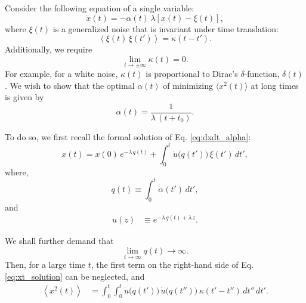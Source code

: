 \documentclass[reprint]{revtex4-1}
\begin{document}
Consider the following equation
of a single variable:
%
\begin{equation}
\dot x(t) = -\alpha(t) \, \lambda \left[ x(t) - \xi(t) \right],
\label{eq:dxdt_alpha}
\end{equation}
%
where $\xi(t)$ is a generalized noise
that is invariant under time translation:
%
\begin{equation}
\left\langle \xi(t) \, \xi(t') \right\rangle
=
\kappa(t - t').
\label{eq:noise_correlation}
\end{equation}
%
Additionally, we require
\begin{equation}
  \lim_{t \rightarrow \pm\infty} \kappa(t) = 0.
  \label{eq:kappat_limit}
\end{equation}
%
For example, for a white noise,
$\kappa(t)$ is proportional to
Dirac's $\delta$-function, $\delta(t)$.
%
We wish to show that the optimal $\alpha(t)$
of minimizing $\langle x^2(t) \rangle$ at long times
is given by
%
\begin{equation}
  \alpha(t) = \frac{1}{\lambda \, (t + t_0)}.
\label{eq:alpha_opt}
\end{equation}



To do so, we first recall
the formal solution of Eq. \eqref{eq:dxdt_alpha}:
%
\begin{equation}
x(t) = x(0) \, e^{-\lambda \, q(t)}
+ \int_0^t \dot u\bigl( q(t') \bigr) \, \xi(t') \, dt',
\label{eq:xt_solution}
\end{equation}
%
where,
%
\begin{equation}
q(t) \equiv \int_0^t \alpha(t') \, dt',
\label{eq:qt_definition}
\end{equation}
%
and
%
\begin{align}
u(z)
&\equiv
e^{-\lambda \, q(t) + \lambda \, z}.
\label{eq:ut_definition}
\end{align}


We shall further demand that
%
\begin{equation}
  \lim_{t \to \infty} q(t) \to \infty.
  \label{eq:qt_limit}
\end{equation}
%
Then, for a large time $t$,
the first term on the right-hand side
of Eq. \eqref{eq:xt_solution} can be neglected, and
%
\begin{align}
\left\langle x^2(t) \right\rangle
&=
\int_0^t \int_0^t
  \dot u\bigl( q(t') \bigr) \,
  \dot u\bigl( q(t'') \bigr) \,
  \kappa(t' - t'') \, dt'' \, dt'.
\label{eq:x2t_average}
\end{align}
\end{document}
